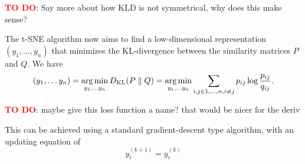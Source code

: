 \textcolor{red}{\textbf{TO DO}}: Say more about how KLD is not symmetrical, why does this make sense? 

The t-SNE algorithm now aims to find a low-dimensional representation $(y_1, \dots, y_n)$ that minimizes the KL-divergence between the similarity matrices $P$ and $Q$. We have 
\begin{equation}
    (y_1, \dots y_n) = \operatorname*{arg\,min}_{y_1, \dots y_n} D_{\text{KL}}(P \parallel Q) = \operatorname*{arg\,min}_{y_1, \dots y_n} \sum_{i,j \in {1,\dots,n}, i \neq j} p_{ij} \log \frac{p_{ij}}{q_{ij}}.
\end{equation}

\textcolor{red}{\textbf{TO DO}}: maybe give this loss function a name? that would be nicer for the deriv 

This can be achieved using a standard gradient-descent type algorithm, with an updating equation of 
\begin{equation}
    y_i^{(k+1)} = y_i^{(k)} 
\end{equation}